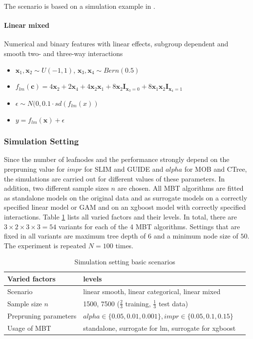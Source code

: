 The scenario is based on a simulation example in \citep{Herbinger.2022}.

\paragraph{Linear mixed}
Numerical and binary features with linear effects, subgroup dependent and smooth two- and three-way interactions
\begin{itemize}
    \item $\textbf{x}_1, \textbf{x}_2 \sim U(-1,1)$, $\textbf{x}_3, \textbf{x}_4 \sim Bern(0.5)$
    \item $f_{lm}(\textbf{c}) = 4   \textbf{x}_2 + 2   \textbf{x}_4  + 4   \textbf{x}_2   \textbf{x}_1 + 8   \textbf{x}_2   \mathbf{I}_{\textbf{x}_3 = 0} +  8 \textbf{x}_1   \textbf{x}_2 \mathbf{I}_{\textbf{x}_4 = 1}$
    \item $\epsilon \sim N(0, 0.1 \cdot sd(f_{lm}(x))$
    \item $y = f_{lm}(\textbf{x}) + \epsilon$
\end{itemize}



\subsubsection{Simulation Setting}
Since the number of leafnodes and the performance strongly depend on the prepruning value for $impr$ for SLIM and GUIDE and $alpha$ for MOB and CTree, the simulations are carried out for different values of these parameters. In addition, two different sample sizes $n$ are chosen. 
All MBT algorithms are fitted as standalone models on the original data and as surrogate models on a correctly specified linear model or GAM and on an xgboost model with correctly specified interactions. 
Table \ref{tab:simulation_setting} lists all varied factors and their levels. In total, there are $3 \times 2 \times 3 \times 3 = 54$ variants for each of the 4 MBT algorithms.
Settings that are fixed in all variants are maximum tree depth of $6$ and a minimum node size of $50$.
The experiment is repeated $N = 100$ times.

\begin{table}[!htb] 

\caption{Simulation setting basic scenarios}
\centering \small
\begin{tabular}[t]{lll}
\hline
Varied factors & levels \\
\hline
Scenario  & linear smooth, linear categorical, linear mixed\\
Sample size $n$  & 1500, 7500 ($\frac{2}{3}$  training, $\frac{1}{3}$ test data)\\
Prepruning parameters   & $alpha \in \{0.05,0.01,0.001\}, impr \in \{0.05,0.1,0.15\}$ \\
Usage of MBT  & standalone, surrogate for lm, surrogate for xgboost \\ 
\hline
\end{tabular}
\label{tab:simulation_setting}
\end{table}

